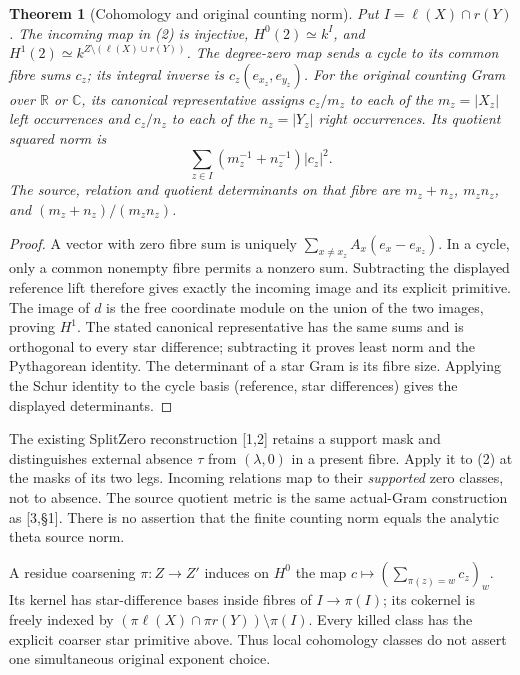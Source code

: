 \documentclass[11pt,a4paper]{article}
\newtheorem{theorem}{Theorem}
\begin{document}
\begin{theorem}[Cohomology and original counting norm]
Put $I=\ell(X)\cap r(Y)$. The incoming map in (2) is injective,
$H^0(2)\simeq k^I$, and $H^1(2)\simeq k^{Z\setminus(\ell(X)\cup r(Y))}$.
The degree-zero map sends a cycle to its common fibre sums $c_z$; its
integral inverse is $c_z(e_{x_z},e_{y_z})$.
For the original counting Gram over $\mathbb R$ or $\mathbb C$, its
canonical representative assigns $c_z/m_z$ to each of the $m_z=|X_z|$
left occurrences and $c_z/n_z$ to each of the $n_z=|Y_z|$ right occurrences.
Its quotient squared norm is
\[
 \boxed{\sum_{z\in I}(m_z^{-1}+n_z^{-1})|c_z|^2.}             \tag{3}
\]
The source, relation and quotient determinants on that fibre are
$m_z+n_z$, $m_zn_z$, and $(m_z+n_z)/(m_zn_z)$.
\end{theorem}
\begin{proof}
A vector with zero fibre sum is uniquely
$\sum_{x\ne x_z}A_x(e_x-e_{x_z})$. In a cycle, only a common nonempty
fibre permits a nonzero sum. Subtracting the displayed reference lift
therefore gives exactly the incoming image and its explicit primitive.
The image of $d$ is the free coordinate module on the union of the two
images, proving $H^1$. The stated canonical representative has the same
sums and is orthogonal to every star difference; subtracting it proves
least norm and the Pythagorean identity. The determinant of a star Gram
is its fibre size. Applying the Schur identity to the cycle basis
(reference, star differences) gives the displayed determinants.
\end{proof}

The existing SplitZero reconstruction [1,2] retains a support mask and
distinguishes external absence $\tau$ from $(\lambda,0)$ in a present
fibre. Apply it to (2) at the masks of its two legs. Incoming relations
map to their \emph{supported} zero classes, not to absence. The source
quotient metric is the same actual-Gram construction as [3,\S1]. There is
no assertion that the finite counting norm equals the analytic theta
source norm.

A residue coarsening $\pi:Z\to Z'$ induces on $H^0$ the map
$c\mapsto(\sum_{\pi(z)=w}c_z)_w$. Its kernel has star-difference bases
inside fibres of $I\to\pi(I)$; its cokernel is freely indexed by
$(\pi\ell(X)\cap\pi r(Y))\setminus\pi(I)$. Every killed class has the
explicit coarser star primitive above. Thus local cohomology classes do
not assert one simultaneous original exponent choice.
\end{document}
